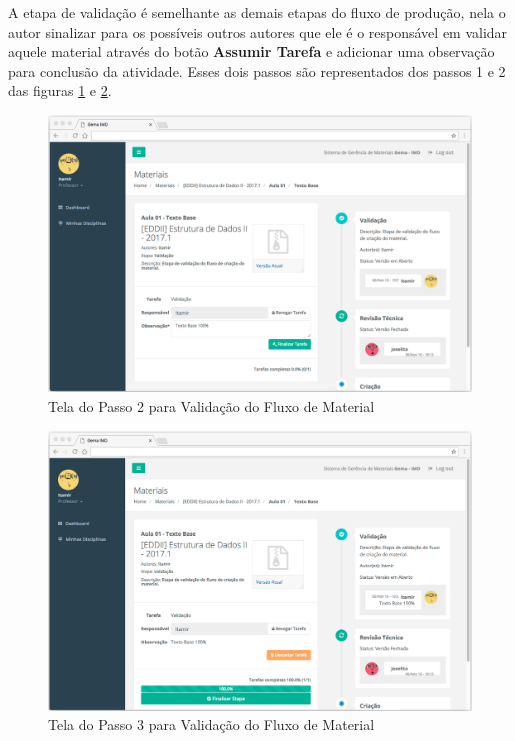 A etapa de validação é semelhante as demais etapas do fluxo de produção, nela o autor sinalizar para os possíveis outros autores que ele é o responsável em validar aquele material através do botão \textbf{Assumir Tarefa} e adicionar uma observação para conclusão da atividade. Esses dois passos são representados dos passos 1 e 2 das figuras \hyperref[fig:endFlow2]{\ref{fig:endFlow2}} e \hyperref[fig:endFlow3]{\ref{fig:endFlow3}}.

\begin{figure}[H]
\centering
     \includegraphics[width=1.0\textwidth]{Screens/EndFlow2.png}
      \caption{Tela do Passo 2 para Validação do Fluxo de Material}
       \label{fig:endFlow2}
\end{figure} 

\begin{figure}[H]
\centering
     \includegraphics[width=1.0\textwidth]{Screens/EndFlow3.png}
      \caption{Tela do Passo 3 para Validação do Fluxo de Material}
       \label{fig:endFlow3}
\end{figure} 

